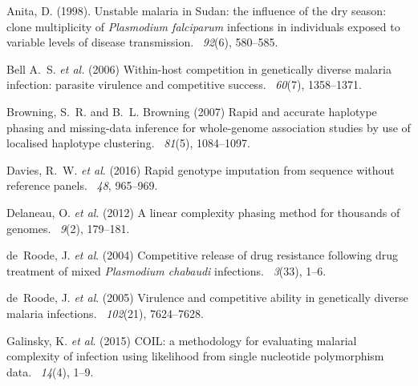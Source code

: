 \documentclass{bioinfo}
\begin{document}
\begin{thebibliography}{}

Anita, D. (1998).
\newblock Unstable malaria in Sudan: the influence of the dry season: clone
  multiplicity of {\it Plasmodium falciparum} infections in individuals exposed to
  variable levels of disease transmission.
~{\em 92\/}(6), 580--585.

Bell A.~S. {\em et al.} (2006)
\newblock Within-host competition in genetically diverse malaria infection: parasite virulence and competitive success.
~{\em 60}(7), 1358--1371.

Browning, S.~R. and B.~L. Browning (2007)
\newblock Rapid and accurate haplotype phasing and missing-data inference for
  whole-genome association studies by use of localised haplotype clustering.
~{\em 81\/}(5), 1084--1097.

Davies, R.~W. {\em et al}. (2016)
Rapid genotype imputation from sequence without reference panels.
~{\em 48\/}, 965--969.

Delaneau, O. {\em et al}. (2012)
\newblock A linear complexity phasing method for thousands of genomes.
~{\em 9\/}(2), 179--181.

de~Roode, J. {\em et al}. (2004)
\newblock Competitive release of drug resistance following drug treatment of mixed {\it Plasmodium chabaudi} infections.
~{\em 3\/}(33), 1--6.

de~Roode, J. {\em et al}. (2005)
\newblock Virulence and competitive ability in genetically diverse malaria infections.
~{\em 102\/}(21), 7624--7628.

Galinsky, K. {\em et al}. (2015)
\newblock COIL: a methodology for evaluating malarial complexity of infection using likelihood from single nucleotide polymorphism data.
~{\em14\/}(4), 1--9.


\end{thebibliography}
\end{document}
